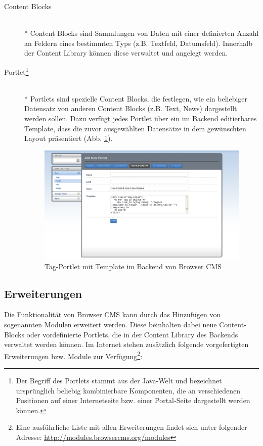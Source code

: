 \begin{description}
\item[Content Blocks]\mbox{~}\\*
Content Blocks sind Sammlungen von Daten mit einer definierten Anzahl an Feldern eines bestimmten Typs (z.B. Textfeld, Datumsfeld). Innerhalb der Content Library können diese verwaltet und angelegt werden.
\item[Portlet\footnote{Der Begriff des Portlets stammt aus der Java-Welt und bezeichnet ursprünglich beliebig kombinierbare Komponenten, die an verschiedenen Positionen auf einer Internetseite bzw. einer Portal-Seite dargestellt werden können.}]\mbox{~}\\*
Portlets sind spezielle Content Blocks, die festlegen, wie ein beliebiger Datensatz von anderen Content Blocks (z.B. Text, News) dargestellt werden sollen. Dazu verfügt jedes Portlet über ein im Backend editierbares Template, dass die zuvor ausgewählten Datensätze in dem gewünschten Layout präsentiert (Abb. \ref{browsertagportlet}).

\begin{figure}[!h]
\begin{center}
\includegraphics[scale=0.3]{images/analyse/browser/tagportlet.png}
\caption{Tag-Portlet mit Template im Backend von Browser CMS}
\label{browsertagportlet}
\end{center}
\end{figure}


\end{description}

\subsection{Erweiterungen}
Die Funktionalität von Browser CMS kann durch das Hinzufügen von sogenannten Modulen erweitert werden. Diese beinhalten dabei neue Content-Blocks oder vordefinierte Portlets, die in der Content Library des Backends verwaltet werden können. Im Internet stehen zusätzlich folgende vorgefertigten Erweiterungen bzw. Module zur Verfügung\footnote{Eine ausführliche Liste mit allen Erweiterungen findet sich unter folgender Adresse: \href{http://modules.browsercms.org/modules}{http://modules.browsercms.org/modules}}:


